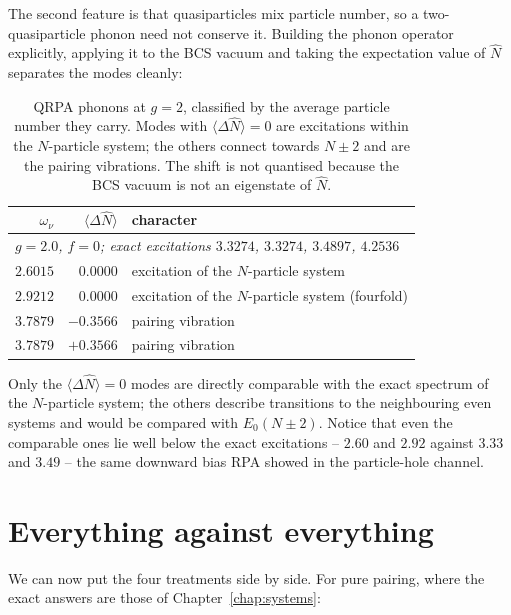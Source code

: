 The second feature is that quasiparticles mix particle number, so a
two-quasiparticle phonon need not conserve it.  Building the phonon operator
explicitly, applying it to the BCS vacuum and taking the expectation value of
$\hat{N}$ separates the modes cleanly:

\begin{table}[h]
\centering
\renewcommand{\arraystretch}{1.25}
\setlength{\tabcolsep}{11pt}
\begin{tabular}{rrl}
\toprule
$\omega_{\nu}$ & $\langle\Delta\hat{N}\rangle$ & character\\
\midrule
\multicolumn{3}{l}{\emph{$g=2.0$, $f=0$; exact excitations
  $3.3274$, $3.3274$, $3.4897$, $4.2536$}}\\
$2.6015$ & $0.0000$ & excitation of the $N$-particle system\\
$2.9212$ & $0.0000$ & excitation of the $N$-particle system (fourfold)\\
$3.7879$ & $-0.3566$ & pairing vibration\\
$3.7879$ & $+0.3566$ & pairing vibration\\
\bottomrule
\end{tabular}
\caption{QRPA phonons at $g=2$, classified by the average particle number
they carry.  Modes with $\langle\Delta\hat{N}\rangle=0$ are excitations
within the $N$-particle system; the others connect towards $N\pm2$ and are
the pairing vibrations.  The shift is not quantised because the BCS vacuum is
not an eigenstate of $\hat{N}$.}
\label{tab:modecontent}
\end{table}

Only the $\langle\Delta\hat{N}\rangle=0$ modes are directly comparable with
the exact spectrum of the $N$-particle system; the others describe transitions
to the neighbouring even systems and would be compared with $E_0(N\pm2)$.
Notice that even the comparable ones lie well below the exact excitations --
$2.60$ and $2.92$ against $3.33$ and $3.49$ -- the same downward bias RPA
showed in the particle-hole channel.

\section{Everything against everything}
\label{sec:allresults}

We can now put the four treatments side by side.  For pure pairing, where the
exact answers are those of Chapter~\ref{chap:systems}:

